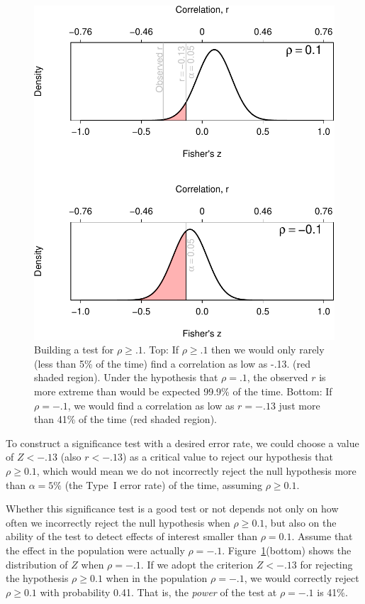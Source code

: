 \documentclass[doc,a4paper,floatsintext,draftfirst]{apa6}
\makeatletter
\def\maxwidth{ %
  \ifdim\Gin@nat@width>\linewidth
    \linewidth
  \else
    \Gin@nat@width
  \fi
}
\makeatother
\begin{document}
\begin{figure}
\includegraphics[width=\maxwidth]{figure/powexp-1} \caption{Building a test for $\rho\geq.1$. Top: If $\rho\geq.1$ then we would only rarely (less than 5\% of the time) find a correlation as low as -.13. (red shaded region). Under the hypothesis that $\rho=.1$, the observed $r$ is more extreme than would be expected 99.9\% of the time. Bottom: If $\rho=-.1$, we would find a correlation as low as $r=-.13$ just more than 41\% of the time (red shaded region).}\label{fig:powexp1}
\end{figure}

To construct a significance test with a desired error rate, we could choose a value of $Z<-.13$ (also $r<-.13$) as a critical value to reject our hypothesis that $\rho\geq0.1$, which would mean we do not incorrectly reject the null hypothesis more than $\alpha=5\%$ (the Type~I error rate) of the time, assuming $\rho\geq0.1$.

Whether this significance test is a good test or not depends not only on how often we incorrectly reject the null hypothesis when $\rho\geq0.1$, but also on the ability of the test to detect effects of interest smaller than $\rho=0.1$.  Assume that the effect in the population were actually $\rho=-.1$. Figure~\ref{fig:powexp1}(bottom) shows the distribution of $Z$ when $\rho=-.1$. If we adopt the criterion $Z<-.13$ for rejecting the hypothesis $\rho\geq0.1$ when in the population $\rho=-.1$, we would correctly reject $\rho\geq0.1$ with probability 0.41. That is, the {\em power} of the test at $\rho=-.1$ is 41\%.
\end{document}
